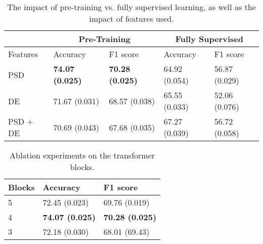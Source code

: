 \documentclass[sigconf]{acmart}
\begin{document}
 \begin{table}[t]
        \caption{The impact of pre-training vs. fully supervised learning, as well as the impact of features used.}
        \label{table:data-pre-train}
        \small
    \setlength
    \tabcolsep{3pt}
        \begin{center}{
                \begin{tabular}{l|ll|ll}
                 \hline
                 \multicolumn{1}{c|}{} & \multicolumn{2}{|c}{Pre-Training}& \multicolumn{2}{|c}{Fully Supervised}\\
                 \hline
                 Features & Accuracy & F1 score &  Accuracy & F1 score\\
                 \hline\hline
                 PSD & \textbf{74.07 (0.025)} & \textbf{70.28 (0.025)} & 64.92 (0.054) & 56.87 (0.029)\\
                 DE & 71.67 (0.031) & 68.57 (0.038) & 65.55 (0.033) & 52.06 (0.076)\\
                 PSD + DE & 70.69 (0.043) & 67.68 (0.035) & 67.27 (0.039) & 56.72 (0.058)\\
                 \hline
                \end{tabular} 
                }
        \end{center}
\end{table}


\begin{table}[t]
        \caption{Ablation experiments on the transformer blocks.}
        \label{table:blocks}
        \small
        \begin{center}{
        \begin{tabular}{lll}
                 \hline
                 Blocks & Accuracy & F1 score  \\
                 \hline\hline
                 5  & 72.45 (0.023) & 69.76 (0.019) \\
                 4  & \textbf{74.07 (0.025)} & \textbf{70.28 (0.025)} \\
                 3  & 72.18 (0.030) & 68.01 (69.43) \\
                 \hline
                \end{tabular} 
                }
        \end{center}
\end{table}
\end{document}
